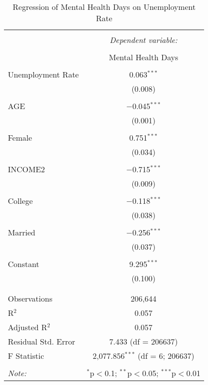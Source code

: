 
\begin{table}[!htbp] \centering 
  \caption{Regression of Mental Health Days on Unemployment Rate} 
  \label{} 
\begin{tabular}{@{\extracolsep{5pt}}lc} 
\\[-1.8ex]\hline 
\hline \\[-1.8ex] 
 & \multicolumn{1}{c}{\textit{Dependent variable:}} \\ 
\cline{2-2} 
\\[-1.8ex] & Mental Health Days \\ 
\hline \\[-1.8ex] 
 Unemployment Rate & 0.063$^{***}$ \\ 
  & (0.008) \\ 
  & \\ 
 AGE & $-$0.045$^{***}$ \\ 
  & (0.001) \\ 
  & \\ 
 Female & 0.751$^{***}$ \\ 
  & (0.034) \\ 
  & \\ 
 INCOME2 & $-$0.715$^{***}$ \\ 
  & (0.009) \\ 
  & \\ 
 College & $-$0.118$^{***}$ \\ 
  & (0.038) \\ 
  & \\ 
 Married & $-$0.256$^{***}$ \\ 
  & (0.037) \\ 
  & \\ 
 Constant & 9.295$^{***}$ \\ 
  & (0.100) \\ 
  & \\ 
\hline \\[-1.8ex] 
Observations & 206,644 \\ 
R$^{2}$ & 0.057 \\ 
Adjusted R$^{2}$ & 0.057 \\ 
Residual Std. Error & 7.433 (df = 206637) \\ 
F Statistic & 2,077.856$^{***}$ (df = 6; 206637) \\ 
\hline 
\hline \\[-1.8ex] 
\textit{Note:}  & \multicolumn{1}{r}{$^{*}$p$<$0.1; $^{**}$p$<$0.05; $^{***}$p$<$0.01} \\ 
\end{tabular} 
\end{table} 
